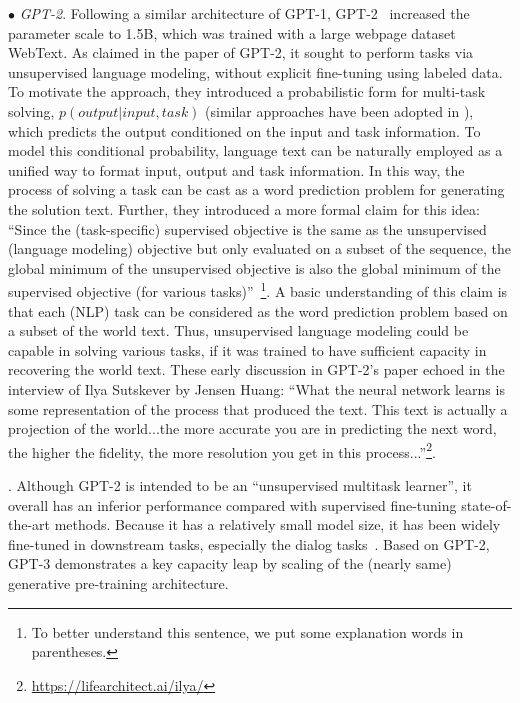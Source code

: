 $\bullet$ \emph{GPT-2}. Following a similar architecture of GPT-1,  GPT-2~\cite{radford-blog-2019-language} increased the parameter scale to 1.5B, which was trained with a large webpage dataset WebText. As claimed in the paper of GPT-2, it sought to perform tasks via unsupervised language modeling, without  explicit fine-tuning using labeled data. To motivate the approach, they  introduced a   probabilistic form for  multi-task solving, \ie  $p(output|input, task)$ (similar approaches have been adopted in \cite{McCann-CoRR-2018-The}), which predicts the output conditioned on the input and task information.  To model this conditional probability,  language text can be naturally employed as a unified way to  format  input, output and task information.  In this way, the process of solving a task  can be cast as a word prediction problem for generating the solution text. Further, they introduced  a more formal claim for this idea: ``Since the (task-specific) supervised objective is the same as the unsupervised (language modeling) objective but only evaluated on a subset of the sequence, the global minimum of the unsupervised objective is also the global minimum of the supervised objective (for various tasks)''~\cite{radford-blog-2019-language}\footnote{To better understand this sentence, we put some explanation words in parentheses.}. 
A basic understanding of this claim is that each (NLP) task can be considered as the word prediction problem based on a subset of the world text. Thus,  unsupervised language modeling could be capable in solving various tasks, if it was trained to have sufficient capacity in recovering the world text.   
These early discussion in GPT-2's paper echoed in the interview of Ilya Sutskever by Jensen Huang: ``What the neural network learns is some representation of the process that produced the text. This text is actually a projection of the world...the more accurate you are in predicting the next word, the higher the fidelity, the more resolution you get in this process...''\footnote{\url{https://lifearchitect.ai/ilya/}}.   
 

. Although GPT-2 is intended to be an  ``unsupervised multitask learner'', it overall has an inferior performance compared with supervised fine-tuning state-of-the-art methods.  
Because it has a relatively small model size, it has been widely fine-tuned in downstream tasks, especially the dialog tasks~\cite{Zhang-ACL-2020-DIALOGPT,Ham-ACL-2020-End}. Based on GPT-2, GPT-3 demonstrates a  key capacity leap by scaling of the (nearly same) generative pre-training architecture.  
 
